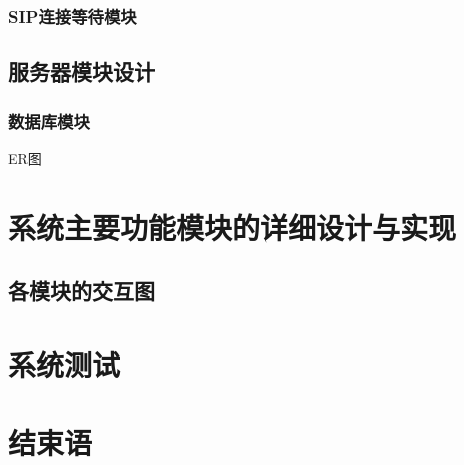 \documentclass[a4paper,AutoFakeBold,oneside,12pt]{book}
\begin{document}
\subsection{SIP连接等待模块}
\section{服务器模块设计}
\subsection{数据库模块}
ER图
\newpage
\chapter{系统主要功能模块的详细设计与实现}
\section{各模块的交互图}
\chapter{系统测试}
\chapter{结束语}


	
%




\end{document}
